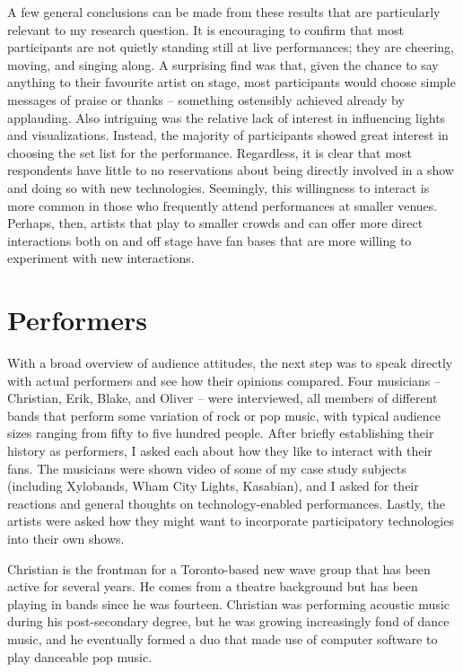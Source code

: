 A few general conclusions can be made from these results that are particularly relevant to my research question. It is encouraging to confirm that most participants are not quietly standing still at live performances; they are cheering, moving, and singing along. A surprising find was that, given the chance to say anything to their favourite artist on stage, most participants would choose simple messages of praise or thanks -- something ostensibly achieved already by applauding. Also intriguing was the relative lack of interest in influencing lights and visualizations. Instead, the majority of participants showed great interest in choosing the set list for the performance. Regardless, it is clear that most respondents have little to no reservations about being directly involved in a show and doing so with new technologies. Seemingly, this willingness to interact is more common in those who frequently attend performances at smaller venues. Perhaps, then, artists that play to smaller crowds and can offer more direct interactions both on and off stage have fan bases that are more willing to experiment with new interactions.


\section{Performers}

With a broad overview of audience attitudes, the next step was to speak directly with actual performers and see how their opinions compared. Four musicians -- Christian, Erik, Blake, and Oliver -- were interviewed, all members of different bands that perform some variation of rock or pop music, with typical audience sizes ranging from fifty to five hundred people. After briefly establishing their history as performers, I asked each about how they like to interact with their fans. The musicians were shown video of some of my case study subjects (including Xylobands, Wham City Lights, Kasabian), and I asked for their reactions and general thoughts on technology-enabled performances. Lastly, the artists were asked how they might want to incorporate participatory technologies into their own shows.

Christian is the frontman for a Toronto-based new wave group that has been active for several years. He comes from a theatre background but has been playing in bands since he was fourteen. Christian was performing acoustic music during his post-secondary degree, but he was growing increasingly fond of dance music, and he eventually formed a duo that made use of computer software to play danceable pop music.
